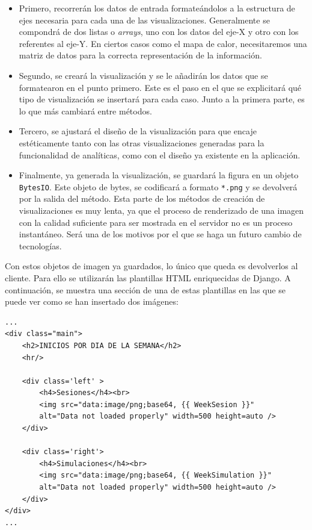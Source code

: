\documentclass[11pt,a4paper]{book}
\begin{document}
			\begin{itemize}
				\item Primero, recorrerán los datos de entrada formateándolos a la estructura de ejes necesaria para cada una de las visualizaciones. Generalmente se compondrá de dos listas o \textit{arrays}, uno con los datos del eje-X y otro con los referentes al eje-Y. En ciertos casos como el mapa de calor, necesitaremos una matriz de datos para la correcta representación de la información.
				
				\item Segundo, se creará la visualización y se le añadirán los datos que se formatearon en el punto primero. Este es el paso en el que se explicitará qué tipo de visualización se insertará para cada caso. Junto a la primera parte, es lo que más cambiará entre métodos.
				
				\item Tercero, se ajustará el diseño de la visualización para que encaje estéticamente tanto con las otras visualizaciones generadas para la funcionalidad de analíticas, como con el diseño ya existente en la aplicación.
				
				\item Finalmente, ya generada la visualización, se guardará la figura en un objeto \texttt{BytesIO}. Este objeto de bytes, se codificará a formato \texttt{*.png} y se devolverá por la salida del método. Esta parte de los métodos de creación de visualizaciones es muy lenta, ya que el proceso de renderizado de una imagen con la calidad suficiente para ser mostrada en el servidor no es un proceso instantáneo. Será una de los motivos por el que se haga un futuro cambio de tecnologías.
			\end{itemize}
			
			Con estos objetos de imagen ya guardados, lo único que queda es devolverlos al cliente. Para ello se utilizarán las plantillas HTML enriquecidas de Django. A continuación, se muestra una sección de una de estas plantillas en las que se puede ver como se han insertado dos imágenes:
			
			\begin{Verbatim}[tabsize=4]
...	
<div class="main">
	<h2>INICIOS POR DIA DE LA SEMANA</h2>
	<hr/>
	
	<div class='left' >
		<h4>Sesiones</h4><br>
		<img src="data:image/png;base64, {{ WeekSesion }}" 
		alt="Data not loaded properly" width=500 height=auto />
	</div>
	
	<div class='right'>
		<h4>Simulaciones</h4><br>
		<img src="data:image/png;base64, {{ WeekSimulation }}" 
		alt="Data not loaded properly" width=500 height=auto />
	</div>
</div>
...
			\end{Verbatim}
			
\end{document}
